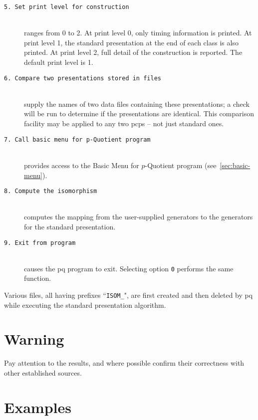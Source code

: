 \documentclass[12pt]{article}
\begin{document}
\begin{description}
\item[\texttt{5.\ Set print level for construction}]\ \\
 ranges from 0 to 2.
 At print level 0, only timing information is printed.
 At print level 1, the standard presentation at the end
 of each class is also printed.
 At print level 2, full detail of the construction is
 reported. The default print level is 1.

\item[\texttt{6.\ Compare two presentations stored in files}]\ \\
 supply the names of two data files containing these
 presentations; a check will be run to determine if the
 presentations are identical. 
 This comparison facility may be applied to any two
 pcps -- not just standard ones.

\item[\texttt{7.\ Call basic menu for p-Quotient program}]\ \\
 provides access to the Basic Menu for $p$-Quotient program
 (see~\ref{sec:basic-menu}).

\item[\texttt{8.\ Compute the isomorphism}]\ \\
 computes the mapping from the user-supplied generators
 to the generators for the standard presentation.

\item[\texttt{9.\ Exit from program}]\ \\
 causes the pq program to exit.
 Selecting option \texttt{0} performs the same function.

\end{description}

Various files, all having prefixes ``\texttt{ISOM\_}", are first created and 
then deleted by pq while executing the standard presentation algorithm. 
\section{Warning}
Pay attention to the results, and where possible confirm 
their correctness with other established sources.

\pagebreak
\appendix
\section{Examples}
\end{document}
